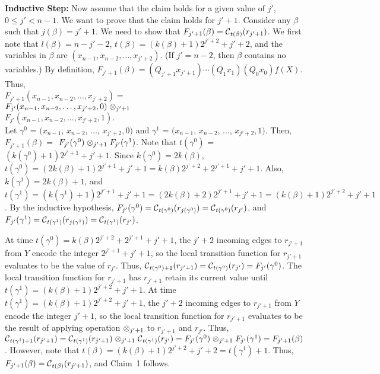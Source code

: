 \smallskip
\noindent
{\bf Inductive Step:} 
Now assume that the claim holds for a given value of $j'$, $0 \leq j' < n-1$.
We want to prove that the claim holds for $j'+1$.
Consider any $\beta$ such that $j(\beta) = j'+1$.
We need to show that $F_{j'+1}(\beta) = \mbox{$\mathcal{C}$}_{t(\beta)}(r_{j'+1})$.
We first note that $l(\beta) = n-j'-2$, 
$t(\beta) = (k(\beta) + 1)2^{j'+2}+j'+2$,
and the variables in $\beta$ are $(x_{n-1}, x_{n-2}, \ldots , x_{j'+2})$.
(If $j' = n-2$, then $\beta$ contains no variables.)
By definition, 
$F_{j'+1}(\beta) =  (Q_{j'+1} x_{j'+1}) \cdots (Q_1 x_1) (Q_0 x_0) f(X)$.
Thus,\\
$F_{j'+1}(x_{n-1}, x_{n-2}, \ldots , x_{j'+2}) = $\\
\hspace*{0.2in}
$F_{j'}(x_{n-1}, x_{n-2}, \ldots , x_{j'+2}, 0) \; \mbox{$\otimes$}_{j'+1} \;$\\
\hspace*{0.4in} $F_{j'}(x_{n-1}, x_{n-2}, \ldots , x_{j'+2}, 1).$\\
Let $\gamma^0$ = $(x_{n-1}$, $x_{n-2}$, $\ldots$, $x_{j'+2}, 0)$
and $\gamma^1$ = $(x_{n-1}$, $x_{n-2}$, $\ldots$, $x_{j'+2}, 1)$.
Then, $F_{j'+1}(\beta) =$  
$F_{j'}(\gamma^0) \; \mbox{$\otimes$}_{j'+1} \; F_{j'}(\gamma^1)$.
Note that
$t(\gamma^0)$ = $(k(\gamma^0)+1)2^{j'+1}+j'+1$.
Since $k(\gamma^0)= 2k(\beta)$,
$t(\gamma^0) = (2k(\beta)+1)2^{j'+1}+j'+1 = k(\beta)2^{j'+2}+2^{j'+1}+j'+1$.
Also, $k(\gamma^1)= 2k(\beta)+1$, and
$t(\gamma^1) = (k(\gamma^1)+1)2^{j'+1}+j'+1= 
(2k(\beta)+2)2^{j'+1}+j'+1 =  (k(\beta)+1)2^{j'+2}+j'+1$.
By the inductive hypothesis,
$F_{j'}(\gamma^0) = \mbox{$\mathcal{C}$}_{t(\gamma^0)}(r_{j(\gamma^0)}) 
= \mbox{$\mathcal{C}$}_{t(\gamma^0)}(r_{j'})$,
and $F_{j'}(\gamma^1) = \mbox{$\mathcal{C}$}_{t(\gamma^1)}(r_{j(\gamma^1)}) 
= \mbox{$\mathcal{C}$}_{t(\gamma^1)}(r_{j'})$.

At time $t(\gamma^0) = k(\beta)2^{j'+2}+2^{j'+1}+j'+1$,
the $j'+2$ incoming edges to $r_{j'+1}$ from $Y$ encode the integer $2^{j'+1}+j'+1$,
so the local transition function for $r_{j'+1}$ evaluates to be the value of $r_{j'}$.
Thus, $\mbox{$\mathcal{C}$}_{t(\gamma^0)+1}(r_{j'+1}) = \mbox{$\mathcal{C}$}_{t(\gamma^0)}(r_{j'}) = F_{j'}(\gamma^0)$.
The local transition function for $r_{j'+1}$ has $r_{j'+1}$ retain its current value until 
$t(\gamma^1) = (k(\beta)+1)2^{j'+2}+j'+1$.
At time $t(\gamma^1) =  (k(\beta)+1)2^{j'+2}+j'+1$,
the $j'+2$ incoming edges to $r_{j'+1}$ from $Y$ encode the integer $j'+1$,
so the local transition function for $r_{j'+1}$ evaluates to be the result
of applying operation $\mbox{$\otimes$}_{j'+1}$ to  $r_{j'+1}$ and $r_{j'}$.
Thus, 
$\mbox{$\mathcal{C}$}_{t(\gamma^1)+1}(r_{j'+1}) = 
 \mbox{$\mathcal{C}$}_{t(\gamma^1)}(r_{j'+1})  \; \mbox{$\otimes$}_{j'+1} \; \mbox{$\mathcal{C}$}_{t(\gamma^1)}(r_{j'}) 
= F_{j'}(\gamma^0)  \; \mbox{$\otimes$}_{j'+1} \; F_{j'}(\gamma^1) = F_{j'+1}(\beta)$.
However, note that $t(\beta) = (k(\beta) + 1)2^{j'+2}+j'+2 =  t(\gamma^1)+1$.
Thus, $F_{j'+1}(\beta) = \mbox{$\mathcal{C}$}_{t(\beta)}(r_{j'+1})$, and
Claim~1 follows. 

